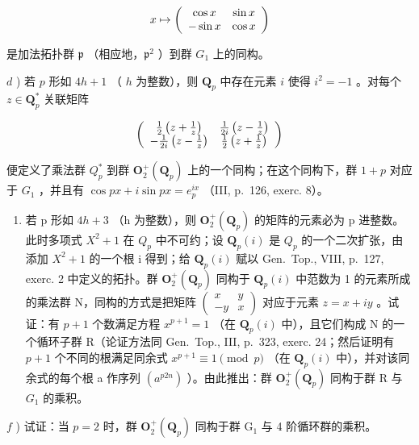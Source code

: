 \[
x \mapsto \left( \begin{array}{c c} \cos x & \sin x \\ - \sin x & \cos x \end{array} \right)
\]

是加法拓扑群 \(\mathfrak{p}\) （相应地，\(\mathfrak{p}^2\) ）到群 \(G_1\) 上的同构。

\(d\) ) 若 \(p\) 形如 \(4h + 1\) （ \(h\) 为整数），则 \(\mathbf{Q}_p\) 中存在元素 \(i\) 使得 \(i^2 = -1\) 。对每个 \(z \in \mathbf{Q}_p^*\) 关联矩阵

\[
\left( \begin{array}{c c} \frac {1}{2} \left(z + \frac {1}{z}\right) & \frac {1}{2 i} \left(z - \frac {1}{z}\right) \\ - \frac {1}{2 i} \left(z - \frac {1}{z}\right) & \frac {1}{2} \left(z + \frac {1}{z}\right) \end{array} \right)
\]

便定义了乘法群 \(Q_{p}^{*}\) 到群 \(\mathbf{O}_{2}^{+}(\mathbf{Q}_{p})\) 上的一个同构；在这个同构下，群 \(1 + p\) 对应于 \(G_{1}\) ，并且有 \(\cos px + i \sin px = e_{p}^{ix}\) （III, p.~126, exerc. 8）。

\begin{enumerate}
\def\labelenumi{\alph{enumi})}
\setcounter{enumi}{4}
\tightlist
\item
  若 p 形如 \(4h + 3\) （h 为整数），则 \(\mathbf{O}_{2}^{+}(\mathbf{Q}_{p})\) 的矩阵的元素必为 p 进整数。此时多项式 \(X^{2} + 1\) 在 \(Q_{p}\) 中不可约；设 \(\mathbf{Q}_{p}(i)\) 是 \(Q_{p}\) 的一个二次扩张，由添加 \(X^{2} + 1\) 的一个根 i 得到；给 \(\mathbf{Q}_{p}(i)\) 赋以 Gen.~Top., VIII, p.~127, exerc. 2 中定义的拓扑。群 \(\mathbf{O}_{2}^{+}(\mathbf{Q}_{p})\) 同构于 \(\mathbf{Q}_{p}(i)\) 中范数为 1 的元素所成的乘法群 N，同构的方式是把矩阵 \(\begin{pmatrix} x & y \\ -y & x \end{pmatrix}\) 对应于元素 \(z = x + iy\) 。试证：有 \(p + 1\) 个数满足方程 \(x^{p+1} = 1\) （在 \(\mathbf{Q}_{p}(i)\) 中），且它们构成 N 的一个循环子群 R（论证方法同 Gen.~Top., III, p.~323, exerc. 24；然后证明有 \(p + 1\) 个不同的根满足同余式 \(x^{p+1} \equiv 1 \pmod{p}\) （在 \(\mathbf{Q}_{p}(i)\) 中），并对该同余式的每个根 a 作序列 \((a^{p2n})\) ）。由此推出：群 \(\mathbf{O}_{2}^{+}(\mathbf{Q}_{p})\) 同构于群 R 与 \(G_{1}\) 的乘积。
\end{enumerate}

\(f\) ) 试证：当 \(p = 2\) 时，群 \(\mathbf{O}_2^+ (\mathbf{Q}_p)\) 同构于群 \(\mathrm{G}_1\) 与 4 阶循环群的乘积。
